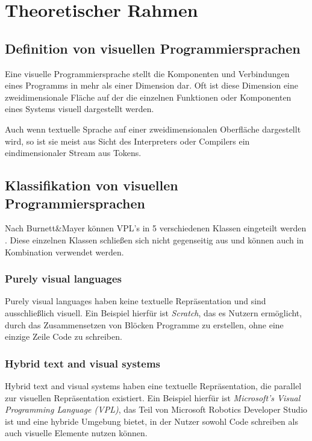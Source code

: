 \documentclass[ngerman]{article}
\begin{document}
\section{Theoretischer Rahmen}

\subsection{Definition von visuellen Programmiersprachen}
Eine visuelle Programmiersprache stellt die Komponenten und Verbindungen eines Programms in mehr als einer Dimension dar. Oft ist diese Dimension eine zweidimensionale Fläche auf der die einzelnen Funktionen oder Komponenten eines Systems visuell dargestellt werden. \cite{Myers}

Auch wenn textuelle Sprache auf einer zweidimensionalen Oberfläche dargestellt wird, so ist sie meist aus Sicht des Interpreters oder Compilers ein eindimensionaler Stream aus Tokens.

\subsection{Klassifikation von visuellen Programmiersprachen}

Nach Burnett\&Mayer können VPL's in 5 verschiedenen Klassen eingeteilt werden \cite{BURNETT1994287}. Diese einzelnen Klassen schließen sich nicht gegenseitig aus und können auch in Kombination verwendet werden.

\subsubsection{Purely visual languages}
Purely visual languages haben keine textuelle Repräsentation und sind ausschließlich visuell. Ein Beispiel hierfür ist \textit{Scratch}, das es Nutzern ermöglicht, durch das Zusammensetzen von Blöcken Programme zu erstellen, ohne eine einzige Zeile Code zu schreiben.

\subsubsection{Hybrid text and visual systems}
Hybrid text and visual systems haben eine textuelle Repräsentation, die parallel zur visuellen Repräsentation existiert. Ein Beispiel hierfür ist \textit{Microsoft's Visual Programming Language (VPL)}, das Teil von Microsoft Robotics Developer Studio ist und eine hybride Umgebung bietet, in der Nutzer sowohl Code schreiben als auch visuelle Elemente nutzen können.
\end{document}
